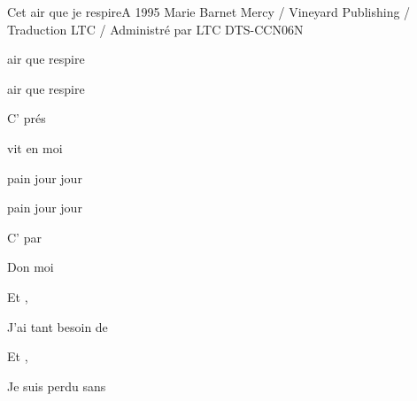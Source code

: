 \begin{song}{Cet air que je respire}{A}
  {1995 Marie Barnet}
  {Mercy / Vineyard Publishing / Traduction LTC / Administr\'e par LTC}
  {}
  {DTS-CCN06N}


	\begin{SBVerse}
 air que  respire

 air que  respire

C'  pr\'es 

 vit en moi 
	\end{SBVerse}

	\begin{SBVerse}

 pain jour  jour

 pain jour  jour

C'  par 

Don  moi 
	\end{SBVerse}


	\begin{SBChorus}
Et    ,

J'ai tant besoin de   

Et    ,

Je suis perdu sans   
	\end{SBChorus}


\end{song}

